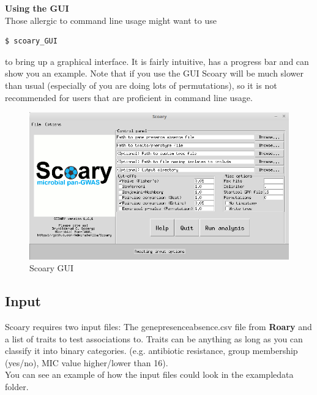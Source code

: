 \documentclass{article}
\begin{document}
      \noindent \textbf{Using the GUI} \\
      \noindent Those allergic to command line usage might want to use
      \begin{lstlisting}[language=python, basicstyle=\small]
        $ scoary_GUI
      \end{lstlisting}

      \noindent to bring up a graphical interface. It is fairly intuitive, has a progress bar and can show you an example. Note that if you use the GUI Scoary will be much slower than usual (especially of you are doing lots of permutations), so it is not recommended for users that are proficient in command line usage.

      \begin{figure}
        \includegraphics[width=\linewidth]{images/scoary_gui.png}
        \caption{Scoary GUI}
        \label{fig:gui}
      \end{figure}
    
    \subsection{Input}
      Scoary requires two input files: The gene\textunderscore presence\textunderscore absence.csv file from \textbf{Roary} and a list of traits to test associations to. Traits can be anything as long as you can classify it into binary categories. (e.g. antibiotic resistance, group membership (yes/no), MIC value higher/lower than 16). \\

      You can see an example of how the input files could look in the exampledata folder.
\end{document}
